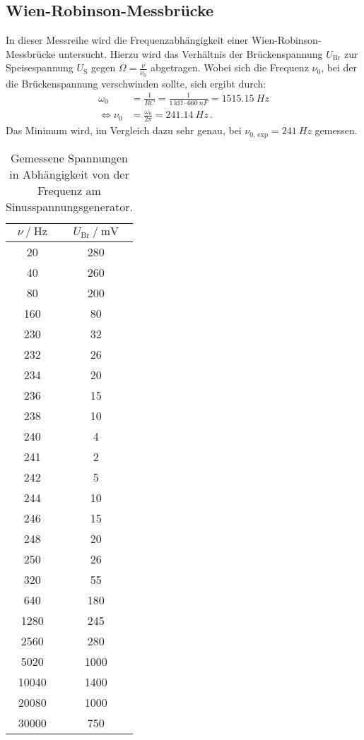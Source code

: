 \subsection{Wien-Robinson-Messbrücke} \label{sec:wienausw}

In dieser Messreihe wird die Frequenzabhängigkeit einer Wien-Robinson-Messbrücke untersucht.
Hierzu wird das Verhältnis der Brückenspannung $U_\text{Br}$ zur Speisespannung $U_\text{S}$
gegen $\Omega = \frac{\nu}{\nu_0}$ abgetragen. Wobei sich die Frequenz $\nu_0$, 
bei der die Brückenspannung verschwinden sollte, sich ergibt durch:
\begin{align*}
  \omega_{0} &=\frac{1}{R C}=\frac{1}{\qty{1}{\kilo\ohm} \cdot \qty{660}{nF}}= \qty{1515.15}{Hz} \\
  \Leftrightarrow \nu_{0} &=\frac{\omega_{0}}{2 \pi} = \qty{241.14}{Hz} \, .
\end{align*}
Das Minimum wird, im Vergleich dazu sehr genau, bei $\nu_\text{0, exp} = \qty{241}{Hz}$ gemessen.

\begin{table} [h]
  \centering
  \caption{Gemessene Spannungen in Abhängigkeit von der Frequenz am Sinusspannungsgenerator.}
  \label{tab:spannung}
  \begin{tabular}{c c}
    \toprule
    $\nu \mathbin{/} \mathrm{Hz}$ &  $U_\text{Br} \mathbin{/} \mathrm{mV}$ \\
    \midrule
        20 &     280 \\
        40 &     260 \\
        80 &     200 \\
       160 &      80 \\
       230 &      32 \\
       232 &      26 \\
       234 &      20 \\
       236 &      15 \\
       238 &      10 \\
       240 &       4 \\
       241 &       2 \\
       242 &       5 \\
       244 &      10 \\
       246 &      15 \\
       248 &      20 \\
       250 &      26 \\
       320 &      55 \\
       640 &     180 \\
      1280 &     245 \\
      2560 &     280 \\
      5020 &    1000 \\
     10040 &    1400 \\
     20080 &    1000 \\
     30000 &     750 \\
    \bottomrule
    \end{tabular}
\end{table}

